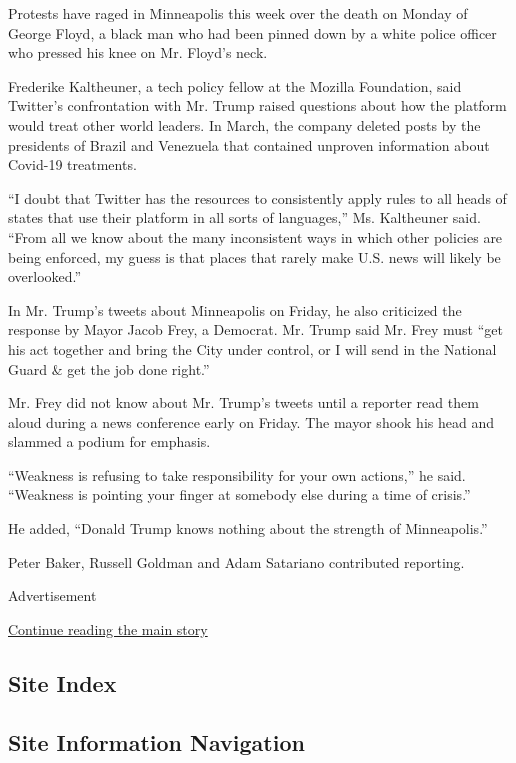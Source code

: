 Protests have raged in Minneapolis this week over the death on Monday of
George Floyd, a black man who had been pinned down by a white police
officer who pressed his knee on Mr. Floyd's neck.

Frederike Kaltheuner, a tech policy fellow at the Mozilla Foundation,
said Twitter's confrontation with Mr. Trump raised questions about how
the platform would treat other world leaders. In March, the company
deleted posts by the presidents of Brazil and Venezuela that contained
unproven information about Covid-19 treatments.

``I doubt that Twitter has the resources to consistently apply rules to
all heads of states that use their platform in all sorts of languages,''
Ms. Kaltheuner said. ``From all we know about the many inconsistent ways
in which other policies are being enforced, my guess is that places that
rarely make U.S. news will likely be overlooked.''

In Mr. Trump's tweets about Minneapolis on Friday, he also criticized
the response by Mayor Jacob Frey, a Democrat. Mr. Trump said Mr. Frey
must ``get his act together and bring the City under control, or I will
send in the National Guard \& get the job done right.''

Mr. Frey did not know about Mr. Trump's tweets until a reporter read
them aloud during a news conference early on Friday. The mayor shook his
head and slammed a podium for emphasis.

``Weakness is refusing to take responsibility for your own actions,'' he
said. ``Weakness is pointing your finger at somebody else during a time
of crisis.''

He added, ``Donald Trump knows nothing about the strength of
Minneapolis.''

Peter Baker, Russell Goldman and Adam Satariano contributed reporting.

Advertisement

\protect\hyperlink{after-bottom}{Continue reading the main story}

\hypertarget{site-index}{%
\subsection{Site Index}\label{site-index}}

\hypertarget{site-information-navigation}{%
\subsection{Site Information
Navigation}\label{site-information-navigation}}

